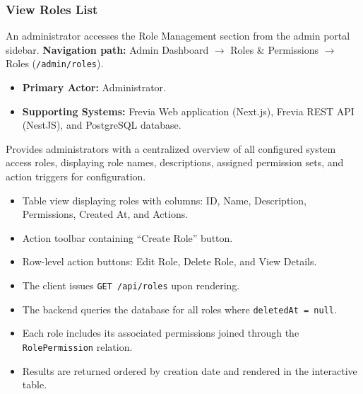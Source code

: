 \subsubsection{ View Roles List}

An administrator accesses the Role Management section from the admin portal sidebar.\newline
\textbf{Navigation path:} Admin Dashboard $\rightarrow$ Roles \& Permissions $\rightarrow$ Roles (\texttt{/admin/roles}).


\begin{itemize}[leftmargin=1.6em,topsep=3pt,itemsep=2pt,parsep=0pt,label=$\bullet$]
    \item \textbf{Primary Actor:} Administrator.
    \item \textbf{Supporting Systems:} Frevia Web application (Next.js), Frevia REST API (NestJS), and PostgreSQL database.
\end{itemize}

\noindent Provides administrators with a centralized overview of all configured system access roles, displaying role names, descriptions, assigned permission sets, and action triggers for configuration.

\begin{itemize}[leftmargin=1.6em,topsep=3pt,itemsep=2pt,parsep=0pt,label=$\bullet$]
    \item Table view displaying roles with columns: ID, Name, Description, Permissions, Created At, and Actions.
    \item Action toolbar containing ``Create Role'' button.
    \item Row-level action buttons: Edit Role, Delete Role, and View Details.
\end{itemize}

\begin{itemize}[leftmargin=1.6em,topsep=3pt,itemsep=2pt,parsep=0pt,label=$\bullet$]
    \item The client issues \texttt{GET /api/roles} upon rendering.
    \item The backend queries the database for all roles where \texttt{deletedAt = null}.
    \item Each role includes its associated permissions joined through the \texttt{RolePermission} relation.
    \item Results are returned ordered by creation date and rendered in the interactive table.
\end{itemize}

